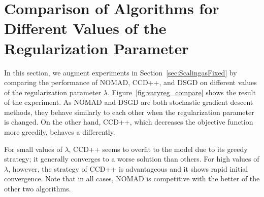 \documentclass{vldb}
\begin{document}
\section{Comparison of Algorithms for Different Values of
    the Regularization Parameter}

  In this section, we augment experiments in
  Section~\ref{sec:ScalingasFixed} by comparing the performance of
  NOMAD, CCD++, and DSGD on different values of the regularization
  parameter $\lambda$.  Figure~\ref{fig:varyreg_compare} shows the
  result of the experiment.  As NOMAD and DSGD are both stochastic
  gradient descent methods, they behave similarly to each other when
  the regularization parameter is changed.  On the other hand, CCD++,
  which decreases the objective function more greedily, behaves a
  differently.

  For small values of $\lambda$, CCD++ seems to overfit to the model
  due to its greedy strategy; it generally converges to a worse
  solution than others.  For high values of $\lambda$, however, the
  strategy of CCD++ is advantageous and it shows rapid initial
  convergence.  Note that in all cases, NOMAD is competitive with the
  better of the other two algorithms.
\end{document}
